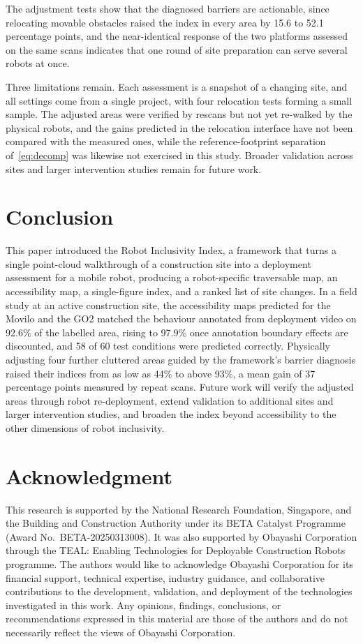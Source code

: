 \documentclass[a4paper, 10pt, conference]{ieeeconf}
\begin{document}
The adjustment tests show that the diagnosed barriers are actionable, since relocating movable obstacles raised the index in every area by 15.6 to 52.1 percentage points, and the near-identical response of the two platforms assessed on the same scans indicates that one round of site preparation can serve several robots at once.

Three limitations remain. Each assessment is a snapshot of a changing site, and all settings come from a single project, with four relocation tests forming a small sample. The adjusted areas were verified by rescans but not yet re-walked by the physical robots, and the gains predicted in the relocation interface have not been compared with the measured ones, while the reference-footprint separation of~\eqref{eq:decomp} was likewise not exercised in this study. Broader validation across sites and larger intervention studies remain for future work.

\section{Conclusion}
\label{sec:conclusion}
This paper introduced the Robot Inclusivity Index, a framework that turns a single point-cloud walkthrough of a construction site into a deployment assessment for a mobile robot, producing a robot-specific traversable map, an accessibility map, a single-figure index, and a ranked list of site changes. In a field study at an active construction site, the accessibility maps predicted for the Movilo and the GO2 matched the behaviour annotated from deployment video on 92.6\% of the labelled area, rising to 97.9\% once annotation boundary effects are discounted, and 58 of 60 test conditions were predicted correctly. Physically adjusting four further cluttered areas guided by the framework's barrier diagnosis raised their indices from as low as 44\% to above 93\%, a mean gain of 37 percentage points measured by repeat scans. Future work will verify the adjusted areas through robot re-deployment, extend validation to additional sites and larger intervention studies, and broaden the index beyond accessibility to the other dimensions of robot inclusivity.

\section*{Acknowledgment}
This research is supported by the National Research Foundation, Singapore, and the Building and Construction Authority under its BETA Catalyst Programme (Award No.\ BETA-20250313008). It was also supported by Obayashi Corporation through the TEAL: Enabling Technologies for Deployable Construction Robots programme. The authors would like to acknowledge Obayashi Corporation for its financial support, technical expertise, industry guidance, and collaborative contributions to the development, validation, and deployment of the technologies investigated in this work. Any opinions, findings, conclusions, or recommendations expressed in this material are those of the authors and do not necessarily reflect the views of Obayashi Corporation.


\end{document}
